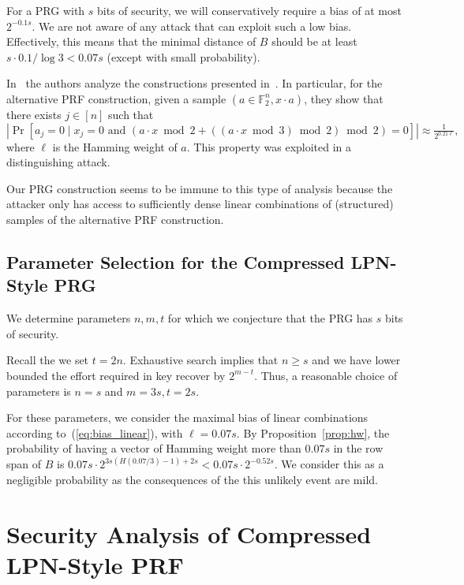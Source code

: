 \documentclass[orivec,envcountsect]{llncs}
\begin{document}
For a PRG with $s$ bits of security, we will conservatively require a bias of at most $2^{-0.1 s}$.
We are not aware of any attack that can exploit such a low bias.
Effectively, this means that the minimal distance of $B$ should be
at least $s \cdot 0.1/\log 3 < 0.07 s$ (except with small probability).


\begin{remark}
In~\cite{CheonCKK20} the authors analyze the constructions presented in~\cite{BonehIPSW18}.
In particular, for the alternative PRF construction,
given a sample $(a \in \mathbb{F}_2^n, x \cdot a)$,
they show that there exists $j \in [n]$ such that
$$|\Pr[a_j = 0 \mid x_j = 0 \text{ and } (a \cdot x \bmod 2 + ((a \cdot x \bmod 3) \bmod 2) \bmod 2) = 0]| \approx \tfrac{1}{2^{0.21 \ell}},$$
where $\ell$ is the Hamming weight of $a$.
This property was exploited in a distinguishing attack.

Our PRG construction seems to be immune to this type of analysis
because the attacker only has access to sufficiently dense linear combinations of (structured) samples
of the alternative PRF construction.
\end{remark}


\subsection{Parameter Selection for the Compressed LPN-Style PRG}

We determine parameters $n,m,t$ for which
we conjecture that the
PRG has $s$ bits of security.

Recall the we set $t = 2n$.
Exhaustive search implies that $n \geq s$ and we have lower
bounded the effort required in key recover by $2^{m - t}$.
Thus, a reasonable choice of parameters is $n = s$ and $m = 3s, t = 2s$.

For these parameters, we consider the maximal bias of linear combinations according to~(\ref{eq:bias_linear}),
with $\ell = 0.07 s$.
By Proposition~\ref{prop:hw},
the probability of having a vector of Hamming weight more than $0.07 s$
in the row span of $B$ is
$0.07 s \cdot 2^{3s (H(0.07/3) - 1) + 2s} < 0.07 s \cdot 2^{-0.52 s}$.
We consider this as a negligible probability
as the consequences of the this unlikely event are mild.


\section{Security Analysis of Compressed LPN-Style PRF}
\end{document}
